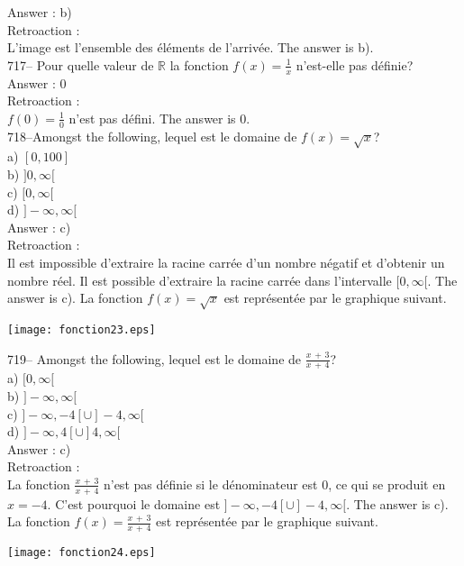 ﻿\documentclass[letterpaper, 12pt]{article}
\begin{document}
Answer : b)\\

Retroaction : \\
L'image est l'ensemble des \'el\'ements de l'arriv\'ee.  The answer is
b).\\

717-- Pour quelle valeur de $\mathbb{R}$ la fonction $f(x)=\frac{1}{x}$
n'est-elle pas d\'efinie?\\

Answer : 0\\

Retroaction :\\
$f(0)=\frac{1}{0}$ n'est pas d\'efini.  The answer is 0.\\

718--Amongst the following, lequel est le domaine de
$f(x)=\sqrt{x}$?\\
a) $[0,100]$\\
b) $]0,\infty[$\\
c) $[0,\infty[$\\
d) $]-\infty, \infty[$\\

Answer : c)\\

Retroaction : \\
Il est impossible d'extraire la racine carr\'ee d'un nombre n\'egatif et
d'obtenir un nombre r\'eel.  Il est possible d'extraire la racine carr\'ee
dans l'intervalle $[0,\infty[$.  The answer is c).  La fonction
$f(x)=\sqrt{x}$ est repr\'esent\'ee par le graphique suivant.\\
    \begin{center}
    \texttt{[image: fonction23.eps]}
    \end{center}


719-- Amongst the following, lequel est le domaine de
$\frac{x\,+\,3}{x\,+\,4}$?\\
a) $[0,\infty[$\\
b) $]-\infty, \infty[$\\
c) $]-\infty,-4[ \cup ]-4,\infty[$\\
d) $]-\infty,4[ \cup ]4,\infty[$\\

Answer : c)\\

Retroaction :\\
La fonction $\frac{x\,+\,3}{x\,+\,4}$ n'est pas d\'efinie si le
d\'enominateur est 0, ce qui se produit en $x=-4$.  C'est pourquoi le
domaine est $]-\infty,-4[ \cup ]-4,\infty[$.  The answer is c).  La
fonction $f(x)=\frac{x\,+\,3}{x\,+\,4}$ est repr\'esent\'ee par le graphique
suivant.\\
    \begin{center}
    \texttt{[image: fonction24.eps]}
    \end{center}
\end{document}
